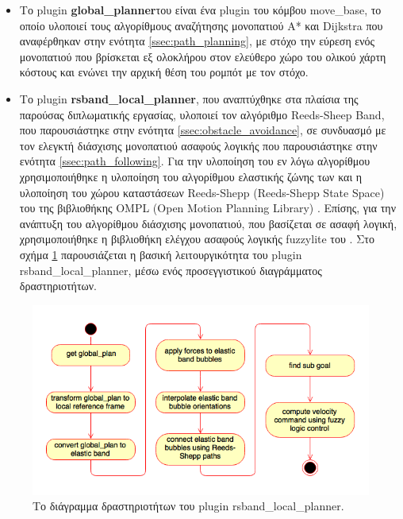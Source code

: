 \begin{itemize}
	\item Το plugin \textbf{global{\_}planner}του \citeauthor{global_planner} \cite{global_planner} είναι ένα plugin του κόμβου move{\_}base, το οποίο υλοποιεί τους αλγορίθμους αναζήτησης μονοπατιού A* και Dijkstra που αναφέρθηκαν στην ενότητα \ref{ssec:path_planning}, με στόχο την εύρεση ενός μονοπατιού που βρίσκεται εξ ολοκλήρου στον ελεύθερο χώρο του ολικού χάρτη κόστους και ενώνει την αρχική θέση του ρομπότ με τον στόχο.
	\item Το plugin \textbf{rsband{\_}local{\_}planner}, που αναπτύχθηκε στα πλαίσια της παρούσας διπλωματικής εργασίας, υλοποιεί τον αλγόριθμο Reeds-Sheep Band, που παρουσιάστηκε στην ενότητα \ref{ssec:obstacle_avoidance}, σε συνδυασμό με τον ελεγκτή διάσχισης μονοπατιού ασαφούς λογικής που παρουσιάστηκε στην ενότητα \ref{ssec:path_following}. Για την υλοποίηση του εν λόγω αλγορίθμου χρησιμοποιήθηκε η υλοποίηση του αλγορίθμου ελαστικής ζώνης των \citeauthor{eband_local_planner} \cite{eband_local_planner} και η υλοποίηση του χώρου καταστάσεων Reeds-Shepp (Reeds-Shepp State Space) του \citeauthor{reeds_shepp_ompl} \cite{reeds_shepp_ompl} της βιβλιοθήκης OMPL (Open Motion Planning Library) \cite{ompl}. Επίσης, για την ανάπτυξη του αλγορίθμου διάσχισης μονοπατιού, που βασίζεται σε ασαφή λογική, χρησιμοποιήθηκε η βιβλιοθήκη ελέγχου ασαφούς λογικής fuzzylite \cite{fuzzylite} του \citeauthor{fuzzylite}. Στο σχήμα \ref{fig:rsband_activity_diagram} παρουσιάζεται η βασική λειτουργικότητα του plugin rsband{\_}local{\_}planner, μέσω ενός προσεγγιστικού διαγράμματος δραστηριοτήτων.
\end{itemize}

\begin{figure}[!ht]
	\centering
	\includegraphics[width=0.7\linewidth]{Chapters/Chapter4/Figures/rsband_activity_diagram.png}
	\caption{Το διάγραμμα δραστηριοτήτων του plugin rsband{\_}local{\_}planner.}
	\label{fig:rsband_activity_diagram}
\end{figure}

